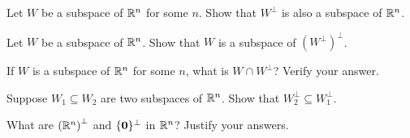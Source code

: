 \item Let $W$ be a subspace of $\mathbb{R}^n$ for some $n$. Show that $W^{\perp}$ is also a subspace of $\mathbb{R}^n$. 

\item Let $W$ be a subspace of $\mathbb{R}^n$. Show that $W$ is a subspace of $(W^\perp)^\perp$.

\item If $W$ is a subspace of $\mathbb{R}^n$ for some $n$, what is $W \cap W^{\perp}$? Verify your answer. 

\item Suppose $W_1\subseteq W_2$ are two subspaces of $\mathbb{R}^n$. Show that $W_2^\perp \subseteq W_1^\perp$.

\item What are $\left(\mathbb{R}^n\right)^{\perp}$ and $\{\mathbf{0}\}^{\perp}$ in $\mathbb{R}^n$? Justify your answers. 

